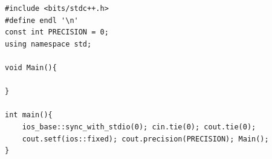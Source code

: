 \begin{verbatim}
#include <bits/stdc++.h>
#define endl '\n'
const int PRECISION = 0;
using namespace std;

void Main(){
	
}

int main(){
	ios_base::sync_with_stdio(0); cin.tie(0); cout.tie(0);
	cout.setf(ios::fixed); cout.precision(PRECISION); Main();
}
\end{verbatim}